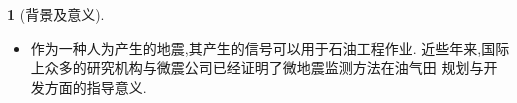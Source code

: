 \documentclass[UTF8]{ctexbeamer}	%
\theoremstyle{plain}
\theoremstyle{definition}
\newtheorem{emt}{}[section]
\theoremstyle{remark}
\numberwithin{equation}{section}
\begin{document}
\begin{frame}
    \begin{emt}[背景及意义]
      
    \begin{itemize}
\item 作为一种人为产生的地震,其产生的信号可以用于石油工程作业.
近些年来,国际上众多的研究机构与微震公司已经证明了微地震监测方法在油气田
规划与开发方面的指导意义.

    \end{itemize}

    
\end{emt}
\end{frame}


\end{document}
